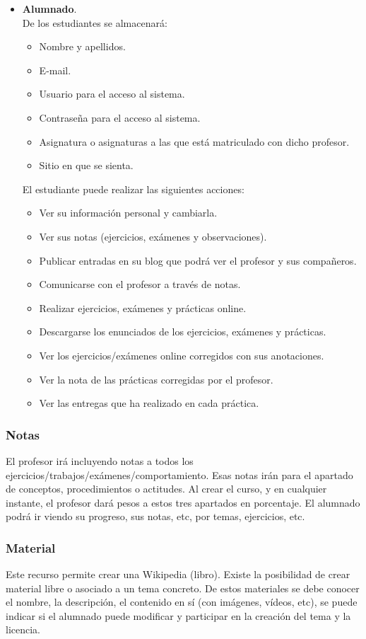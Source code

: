 \documentclass[12pt,twoside,a4paper]{article}
\begin{document}
\begin{itemize}
\item \textbf{Alumnado}.\\
De los estudiantes se almacenará:
\begin{itemize}
\item Nombre y apellidos.
\item E-mail.
\item Usuario para el acceso al sistema.
\item Contraseña para el acceso al sistema.
\item Asignatura o asignaturas a las que está matriculado con dicho profesor.
\item Sitio en que se sienta.
\end{itemize}
El estudiante puede realizar las siguientes acciones:
\begin{itemize}
\item Ver su información personal y cambiarla.
\item Ver sus notas (ejercicios, exámenes y observaciones).
\item Publicar entradas en su blog que podrá ver el profesor y sus compañeros.
\item Comunicarse con el profesor a través de notas.
\item Realizar ejercicios, exámenes y prácticas online.
\item Descargarse los enunciados de los ejercicios, exámenes y prácticas.
\item Ver los ejercicios/exámenes online corregidos con sus anotaciones.
\item Ver la nota de las prácticas corregidas por el profesor.
\item Ver las entregas que ha realizado en cada práctica.
\end{itemize}
\end{itemize}

\subsubsection{Notas}
El profesor irá incluyendo notas a todos los ejercicios/trabajos/exámenes/comportamiento. Esas notas irán para el apartado de conceptos, procedimientos o actitudes. Al crear el curso, y en cualquier instante, el profesor dará pesos a estos tres apartados en porcentaje. El alumnado podrá ir viendo su progreso, sus notas, etc, por temas, ejercicios, etc.

\subsubsection{Material}
Este recurso permite crear una Wikipedia (libro). Existe la posibilidad de crear material libre o asociado a un tema concreto. De estos materiales se debe conocer el nombre, la descripción, el contenido en sí (con imágenes, vídeos, etc), se puede indicar si el alumnado puede modificar y participar en la creación del tema y la licencia.
\end{document}

